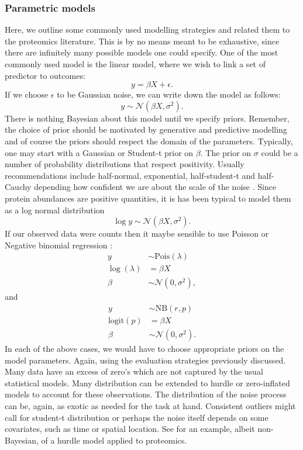 \documentclass[12pt,english]{article}
\begin{document}
\subsubsection{Parametric models}
Here, we outline some commonly used modelling strategies and related them to the proteomics literature. This is by no means meant to be exhaustive, since there are infinitely many possible models one could specify. One of the most commonly used model is the linear model, where we wish to link a set of predictor to outcomes:
\begin{equation}
y = \beta X + \epsilon.
\end{equation}
If we choose $\epsilon$ to be Gaussian noise, we can write down the model as follows:
\begin{equation}
y \sim \mathcal{N}(\beta X, \sigma^2).
\end{equation}
There is nothing Bayesian about this model until we specify priors. Remember, the choice of prior should be motivated by generative and predictive modelling and of course the priors should respect the domain of the parameters. Typically, one may start with a Gaussian or Student-t prior on $\beta$. The prior on $\sigma$ could be a number of probability distributions that respect positivity. Usually recommendations include half-normal, exponential, half-student-t and half-Cauchy depending how confident we are about the scale of the noise \citep{Gelman::2017}. Since protein abundances are positive quantities, it is has been typical to model them as a log normal distribution
\begin{equation}
\log y  \sim \mathcal{N}(\beta X, \sigma^2).
\end{equation}   	
If our observed data were counts then it maybe sensible to use Poisson or Negative binomial regression \citep{Lawless::1987}:
\begin{equation}
\begin{split}
y &\sim \text{Pois}(\lambda)\\
\log(\lambda) &= \beta X\\
\beta &\sim \mathcal{N}(0, \sigma^2),
\end{split}
\end{equation}
and
\begin{equation}
	\begin{split}
		y &\sim \text{NB}(r, p)\\
		\text{logit}(p) &= \beta X\\
		\beta &\sim \mathcal{N}(0, \sigma^2).
	\end{split}
\end{equation}
In each of the above cases, we would have to choose appropriate priors on the model parameters. Again, using the evaluation strategies previously discussed. Many data have an excess of zero's which are not captured by the usual statistical models. Many distribution can be extended to hurdle or zero-inflated models to account for these observations. The distribution of the noise process can be, again, as exotic as needed for the task at hand. Consistent outliers might call for student-t distribution or perhaps the noise itself depends on some covariates, such as time or spatial location. See \citet{Goeminne::2020} for an example, albeit non-Bayesian, of a hurdle model applied to proteomics.
\end{document}
